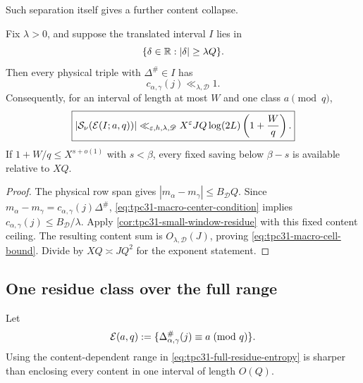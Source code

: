 Such separation itself gives a further content collapse.

\begin{proposition}
\label{prop:tpc31-macro-content-collapse}
Fix $\lambda>0$, and suppose the translated interval $I$ lies in
\begin{equation}
 \{\delta\in\mathbb R:|\delta|\ge\lambda Q\}.
 \label{eq:tpc31-macro-center-condition}
\end{equation}
Then every physical triple with $\Delta^\#\in I$ has
\begin{equation}
 c_{\alpha,\gamma}(j)\ll_{\lambda,\mathscr D}1.
 \label{eq:tpc31-macro-content-bounded}
\end{equation}
Consequently, for an interval of length at most $W$ and one class
$a\pmod q$,
\begin{equation}
 \boxed{
 |\mathcal S_\nu(\mathcal E(I;a,q))|
 \ll_{\varepsilon,h,\lambda,\mathscr D}
 X^\varepsilon JQ\log(2L)\left(1+\frac Wq\right).}
 \label{eq:tpc31-macro-cell-bound}
\end{equation}
If $1+W/q\le X^{s+o(1)}$ with $s<\beta$, every fixed saving below
$\beta-s$ is available relative to $XQ$.
\end{proposition}

\begin{proof}
The physical row span gives
$|m_\alpha-m_\gamma|\le B_{\mathscr D}Q$.  Since
$m_\alpha-m_\gamma=c_{\alpha,\gamma}(j)\Delta^\#$,
\eqref{eq:tpc31-macro-center-condition} implies
$c_{\alpha,\gamma}(j)\le B_{\mathscr D}/\lambda$.  Apply
\cref{cor:tpc31-small-window-residue} with this fixed content ceiling.
The resulting content sum is $O_{\lambda,\mathscr D}(J)$, proving
\eqref{eq:tpc31-macro-cell-bound}.  Divide by
$XQ\asymp JQ^2$ for the exponent statement.
\end{proof}

\subsection{One residue class over the full range}

Let
\begin{equation}
 \mathcal E(a,q)
 :=\{\Delta^\#_{\alpha,\gamma}(j)\equiv a\!\pmod q\}.
 \label{eq:tpc31-full-residue-event}
\end{equation}
Using the content-dependent range in
\eqref{eq:tpc31-full-residue-entropy} is sharper than enclosing every
content in one interval of length $O(Q)$.

